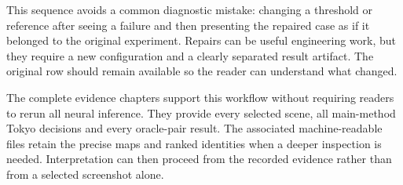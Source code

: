 This sequence avoids a common diagnostic mistake: changing a threshold or reference after seeing a failure and then presenting the repaired case as if it belonged to the original experiment. Repairs can be useful engineering work, but they require a new configuration and a clearly separated result artifact. The original row should remain available so the reader can understand what changed.

The complete evidence chapters support this workflow without requiring readers to rerun all neural inference. They provide every selected scene, all main-method Tokyo decisions and every oracle-pair result. The associated machine-readable files retain the precise maps and ranked identities when a deeper inspection is needed. Interpretation can then proceed from the recorded evidence rather than from a selected screenshot alone.
